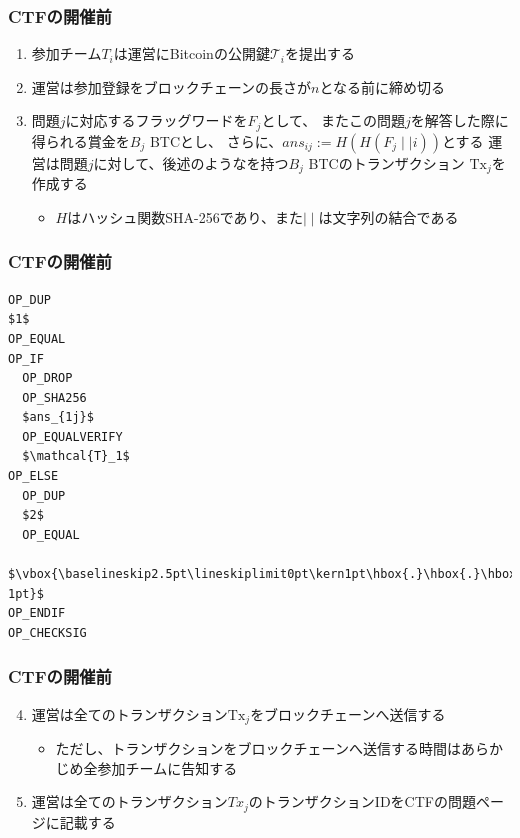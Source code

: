 \begin{frame}
  \frametitle{CTFの開催前}

  \pause
  \begin{enumerate}
    \item<+-> 参加チーム$T_i$は運営にBitcoinの公開鍵$\mathcal{T}_i$を提出する
    \item<+-> 運営は参加登録をブロックチェーンの長さが$n$となる前に締め切る
    \item<+-> 問題$j$に対応するフラッグワードを$F_j$として、
    またこの問題$j$を解答した際に得られる賞金を$B_j$ BTCとし、
    さらに、$ans_{ij} := H\left(H(F_j \mid\mid i)\right)$とする
    運営は問題$j$に対して、後述のような\ScriptPubKey を持つ$B_j$ BTCのトランザクション
    $\text{Tx}_j$を作成する
    \begin{itemize}
      \item $H$はハッシュ関数SHA-256であり、また$\mid\mid$は文字列の結合である
    \end{itemize}
  \end{enumerate}
\end{frame}

\begin{frame}[fragile]
  \frametitle{CTFの開催前}

\begin{lstlisting}[style=bitcoin-script, caption={$\text{Tx}_j$の\ScriptPubKey}]
OP_DUP
$1$
OP_EQUAL
OP_IF
  OP_DROP
  OP_SHA256
  $ans_{1j}$
  OP_EQUALVERIFY
  $\mathcal{T}_1$
OP_ELSE
  OP_DUP
  $2$
  OP_EQUAL
  $\vbox{\baselineskip2.5pt\lineskiplimit0pt\kern1pt\hbox{.}\hbox{.}\hbox{.}\kern-1pt}$
OP_ENDIF
OP_CHECKSIG 
\end{lstlisting}
\end{frame}

\begin{frame}
  \frametitle{CTFの開催前}

  \begin{enumerate}
    \setcounter{enumi}{3}

    \item<+-> 運営は全てのトランザクション$\text{Tx}_j$をブロックチェーンへ送信する
    \begin{itemize}
      \item ただし、トランザクションをブロックチェーンへ送信する時間はあらかじめ全参加チームに告知する
    \end{itemize}
    
    \item<+-> 運営は全てのトランザクション$Tx_j$のトランザクションIDをCTFの問題ページに記載する
  \end{enumerate}
\end{frame}

